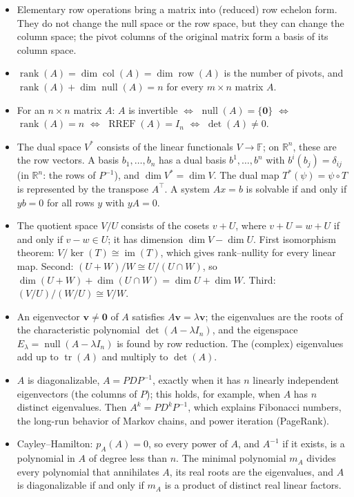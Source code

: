 \documentclass[11pt]{article}
\theoremstyle{definition}
\theoremstyle{plain}
\theoremstyle{remark}
\DeclareMathOperator{\im}{im}
\DeclareMathOperator{\rank}{rank}
\DeclareMathOperator{\Null}{null}
\DeclareMathOperator{\col}{col}
\DeclareMathOperator{\row}{row}
\DeclareMathOperator{\RREF}{RREF}
\DeclareMathOperator{\tr}{tr}
\begin{document}
\begin{itemize}[leftmargin=*]
	\item Elementary row operations bring a matrix into (reduced) row echelon form. They do not change the null space or the row space, but they can change the column space; the pivot columns of the original matrix form a basis of its column space.
	\item $\rank(A) = \dim \col(A) = \dim \row(A)$ is the number of pivots, and $\rank(A) + \dim \Null(A) = n$ for every $m \times n$ matrix $A$.
	\item For an $n \times n$ matrix $A$: $A$ is invertible $\iff$ $\Null(A) = \{\mathbf{0}\}$ $\iff$ $\rank(A) = n$ $\iff$ $\RREF(A) = I_n$ $\iff$ $\det(A) \neq 0$.
	\item The dual space $V^*$ consists of the linear functionals $V \to \mathbb{F}$; on $\mathbb{R}^n$, these are the row vectors. A basis $b_1, \ldots, b_n$ has a dual basis $b^1, \ldots, b^n$ with $b^i(b_j) = \delta_{ij}$ (in $\mathbb{R}^n$: the rows of $P^{-1}$), and $\dim V^* = \dim V$. The dual map $T^*(\psi) = \psi \circ T$ is represented by the transpose $A^\top$. A system $Ax = b$ is solvable if and only if $yb = 0$ for all rows $y$ with $yA = 0$.
	\item The quotient space $V/U$ consists of the cosets $v + U$, where $v + U = w + U$ if and only if $v - w \in U$; it has dimension $\dim V - \dim U$. First isomorphism theorem: $V/\ker(T) \cong \im(T)$, which gives rank--nullity for every linear map. Second: $(U + W)/W \cong U/(U \cap W)$, so $\dim(U + W) + \dim(U \cap W) = \dim U + \dim W$. Third: $(V/U)/(W/U) \cong V/W$.
	\item An eigenvector $\mathbf{v} \neq \mathbf{0}$ of $A$ satisfies $A\mathbf{v} = \lambda \mathbf{v}$; the eigenvalues are the roots of the characteristic polynomial $\det(A - \lambda I_n)$, and the eigenspace $E_\lambda = \Null(A - \lambda I_n)$ is found by row reduction. The (complex) eigenvalues add up to $\tr(A)$ and multiply to $\det(A)$.
	\item $A$ is diagonalizable, $A = PDP^{-1}$, exactly when it has $n$ linearly independent eigenvectors (the columns of $P$); this holds, for example, when $A$ has $n$ distinct eigenvalues. Then $A^k = PD^kP^{-1}$, which explains Fibonacci numbers, the long-run behavior of Markov chains, and power iteration (PageRank).
	\item Cayley--Hamilton: $p_A(A) = 0$, so every power of $A$, and $A^{-1}$ if it exists, is a polynomial in $A$ of degree less than $n$. The minimal polynomial $m_A$ divides every polynomial that annihilates $A$, its real roots are the eigenvalues, and $A$ is diagonalizable if and only if $m_A$ is a product of distinct real linear factors.

\end{itemize}
\end{document}

